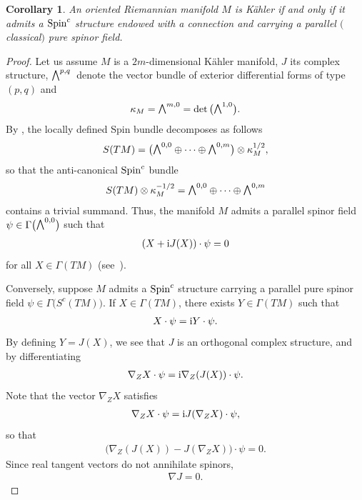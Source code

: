 \documentclass[pdftex]{sigma}
\newcommand{\ext}{\raise1pt\hbox{\small$\bigwedge$}}
\numberwithin{equation}{section}
\newtheorem{Corollary}[Theorem]{Corollary}
\begin{document}
\begin{Corollary} An oriented Riemannian manifold $M$ is K\"ahler if and only if it admits a ${\rm Spin}^c$ structure endowed with a connection and carrying a parallel $($classical$)$ pure spinor field.
\end{Corollary}
\begin{proof} Let us assume $M$ is a $2m$-dimensional K\"ahler manifold, $J$ its complex structure, $\ext^{p,q}$~denote the vector bundle of exterior differential forms of type $(p,q)$ and
\begin{gather*}\kappa_M=\ext^{m,0}= \det\big(\ext^{1,0}\big).\end{gather*}
By \cite{Hitchin}, the locally defined Spin bundle decomposes as follows
\begin{gather*}S(TM) = \big(\ext^{0,0}\oplus \cdots \oplus \ext^{0,m}\big)\otimes \kappa_M^{1/2},\end{gather*}
so that the anti-canonical ${\rm Spin}^c$ bundle
\begin{gather*}S(TM)\otimes \kappa_M^{-1/2} =\ext^{0,0}\oplus \cdots \oplus \ext^{0,m}\end{gather*}
contains a trivial summand. Thus, the manifold $M$ admits a parallel spinor field $\psi\in \Gamma\big(\ext^{0,0}\big)$ such that
\begin{gather*}(X+{\rm i}J(X))\cdot\psi=0\end{gather*}
for all $X\in \Gamma(TM)$ (see~\cite{Friedrich}).

Conversely, suppose $M$ admits a ${\rm Spin}^c$ structure carrying a parallel pure spinor field $\psi\in \Gamma \big(S^c(TM)\big)$. If $X\in \Gamma(TM)$, there exists $Y\in \Gamma(TM)$ such that
\begin{gather*}X\cdot \psi= {\rm i} Y\cdot \psi.\end{gather*}
By defining $Y=J(X)$, we see that $J$ is an orthogonal complex structure, and by differentiating
\begin{gather*}\nabla_ZX\cdot \psi = {\rm i} \nabla_Z(J(X))\cdot \psi.\end{gather*}
Note that the vector $\nabla_ZX$ satisfies
\begin{gather*}\nabla_ZX\cdot \psi= {\rm i} J(\nabla_ZX)\cdot \psi,\end{gather*}
so that
\begin{gather*}\big(\nabla_Z(J(X))-J(\nabla_ZX)\big)\cdot \psi=0.\end{gather*}
Since real tangent vectors do not annihilate spinors,
\begin{gather*}\nabla J=0.\tag*{\qed}\end{gather*}\renewcommand{\qed}{}
\end{proof}
\end{document}

